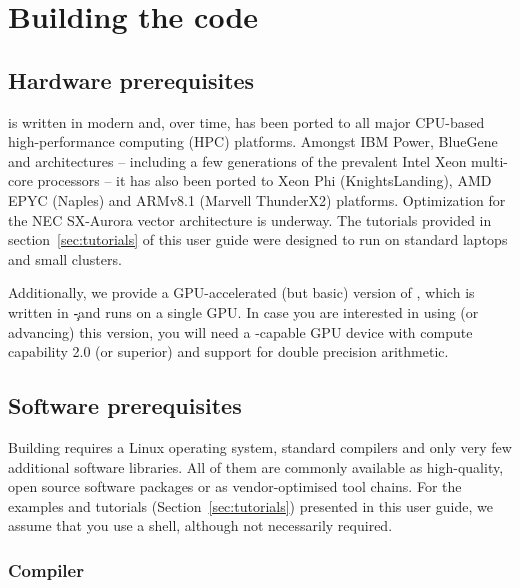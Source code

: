 \documentclass[a4paper, 11pt, DIV=11]{scrartcl}
\begin{document}
\section{Building the code}
\label{sec:buildingTheCode}

\subsection{Hardware prerequisites}
\label{sec:hardwarePrerequisites}

\nsc is written in modern \fortran and, over time, has been ported to all major
CPU-based high-performance computing (HPC) platforms. Amongst IBM Power,
BlueGene and  architectures -- including a few generations
of the prevalent Intel Xeon multi-core processors -- it has also been
ported to Xeon Phi (KnightsLanding), AMD EPYC (Naples) and ARMv8.1
(Marvell ThunderX2) platforms. Optimization for the NEC SX-Aurora vector
architecture is underway. The tutorials provided in section~\ref{sec:tutorials} of
this user guide were designed to run on standard laptops and small clusters.
\par
Additionally, we provide a GPU-accelerated (but basic) version of \nsc, which is
written in \c-\cuda and runs on a single GPU. In case you are interested in using
(or advancing) this version, you will need a \cuda-capable GPU device with compute
capability 2.0 (or superior) and support for double precision arithmetic.

\subsection{Software prerequisites}
\label{sec:softwarePrerequisites}

Building \nsc requires a Linux operating system, standard compilers and only
very few additional software libraries. All of them are commonly available as
high-quality, open source software packages or as vendor-optimised tool chains.
For the examples and tutorials (Section~\ref{sec:tutorials}) presented in this user
guide, we assume that you use a  shell, although not necessarily 
required.

\subsubsection{Compiler}
\label{sec:compiler}
\end{document}
